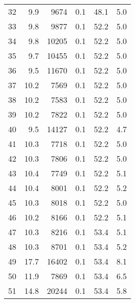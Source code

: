 \begin{tabular}{|r|r|r|r|r|r|}
32 &  9.9 & 9674 & 0.1 & 48.1 & 5.0\\
33 &  9.8 & 9877 & 0.1 & 52.2 & 5.0\\
34 &  9.8 & 10205 & 0.1 & 52.2 & 5.0\\
35 &  9.7 & 10455 & 0.1 & 52.2 & 5.0\\
36 &  9.5 & 11670 & 0.1 & 52.2 & 5.0\\
37 &  10.2 & 7569 & 0.1 & 52.2 & 5.0\\
38 &  10.2 & 7583 & 0.1 & 52.2 & 5.0\\
39 &  10.2 & 7822 & 0.1 & 52.2 & 5.0\\
40 &  9.5 & 14127 & 0.1 & 52.2 & 4.7\\
41 &  10.3 & 7718 & 0.1 & 52.2 & 5.0\\
42 &  10.3 & 7806 & 0.1 & 52.2 & 5.0\\
43 &  10.4 & 7749 & 0.1 & 52.2 & 5.1\\
44 &  10.4 & 8001 & 0.1 & 52.2 & 5.2\\
45 &  10.3 & 8018 & 0.1 & 52.2 & 5.0\\
46 &  10.2 & 8166 & 0.1 & 52.2 & 5.1\\
47 &  10.3 & 8216 & 0.1 & 53.4 & 5.1\\
48 &  10.3 & 8701 & 0.1 & 53.4 & 5.2\\
49 &  17.7 & 16402 & 0.1 & 53.4 & 8.1\\
50 &  11.9 & 7869 & 0.1 & 53.4 & 6.5\\
51 &  14.8 & 20244 & 0.1 & 53.4 & 5.8\\
\hline
\end{tabular}
